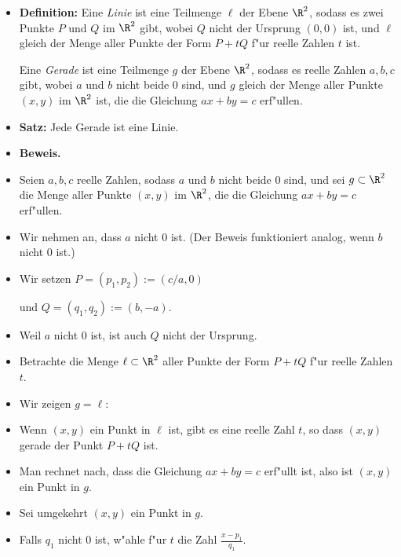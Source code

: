 \documentclass[a4paper%
]{report}
\begin{document}
\Large

\begin{itemize}[\mbox{}]
\item {\bfseries Definition:} Eine \emph{Linie} ist eine Teilmenge
  $\ell$ der Ebene $\R^2$, sodass es zwei Punkte $P$ und $Q$ im $\R^2$
  gibt, wobei $Q$ nicht der Ursprung $(0,0)$ ist, und $\ell$ gleich
  der Menge aller Punkte der Form $P+t Q$ f"ur reelle Zahlen $t$ ist.
  \medskip

  Eine \emph{Gerade} ist eine Teilmenge $g$ der Ebene $\R^2$, sodass
  es reelle Zahlen $a,b,c$ gibt, wobei $a$ und $b$ nicht beide $0$
  sind, und $g$ gleich der Menge aller Punkte $(x,y)$ im $\R^2$ ist,
  die die Gleichung $ax+by=c$ erf"ullen.
\item {\bfseries Satz:} Jede Gerade ist eine Linie.
\item {\bfseries Beweis.}
\item Seien $a,b,c$ reelle Zahlen, sodass $a$ und $b$ nicht beide $0$
  sind, und sei $g \subset \R^2$ die Menge aller Punkte $(x,y)$ im
  $\R^2$, die die Gleichung $ax+by=c$ erf"ullen.
\item Wir nehmen an, dass $a$ nicht $0$ ist. (Der Beweis funktioniert
  analog, wenn $b$ nicht $0$ ist.)
\item Wir setzen $P=(p_{1},p_{2}):=(c/a,0)$

  und $Q=(q_{1},q_{2}):=(b,-a)$.
\item Weil $a$ nicht $0$ ist, ist auch $Q$ nicht der Ursprung.
\item Betrachte die Menge $\ell \subset \R^2$ aller Punkte der Form
  $P+tQ$ f"ur reelle Zahlen $t$.
\item Wir zeigen $g=\ell$:
\item Wenn $(x,y)$ ein Punkt in $\ell$ ist, gibt es eine reelle Zahl
  $t$, so dass $(x,y)$ gerade der Punkt $P+tQ$ ist.
\item Man rechnet nach, dass die Gleichung $ax+by=c$ erf"ullt ist,
  also ist $(x,y)$ ein Punkt in $g$.
\item Sei umgekehrt $(x,y)$ ein Punkt in $g$.
\item Falls $q_1$ nicht $0$ ist, w"ahle f"ur $t$ die Zahl
  $\displaystyle \frac{x-p_1}{q_1}$.
  

\end{itemize}
\end{document}
